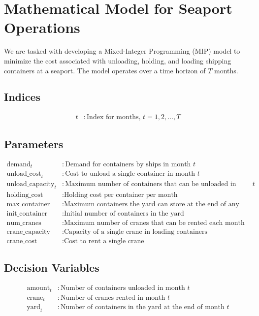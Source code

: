 \documentclass{article}
\begin{document}
\section*{Mathematical Model for Seaport Operations}

We are tasked with developing a Mixed-Integer Programming (MIP) model to minimize the cost associated with unloading, holding, and loading shipping containers at a seaport. The model operates over a time horizon of \( T \) months.

\subsection*{Indices}
\begin{align*}
t & : \text{Index for months, } t = 1, 2, \ldots, T
\end{align*}

\subsection*{Parameters}
\begin{align*}
\text{demand}_t & : \text{Demand for containers by ships in month } t \\
\text{unload\_cost}_t & : \text{Cost to unload a single container in month } t \\
\text{unload\_capacity}_t & : \text{Maximum number of containers that can be unloaded in month } t \\
\text{holding\_cost} & : \text{Holding cost per container per month} \\
\text{max\_container} & : \text{Maximum containers the yard can store at the end of any month} \\
\text{init\_container} & : \text{Initial number of containers in the yard} \\
\text{num\_cranes} & : \text{Maximum number of cranes that can be rented each month} \\
\text{crane\_capacity} & : \text{Capacity of a single crane in loading containers} \\
\text{crane\_cost} & : \text{Cost to rent a single crane}
\end{align*}

\subsection*{Decision Variables}
\begin{align*}
\text{amount}_t & : \text{Number of containers unloaded in month } t \\
\text{crane}_t & : \text{Number of cranes rented in month } t \\
\text{yard}_t & : \text{Number of containers in the yard at the end of month } t
\end{align*}
\end{document}
